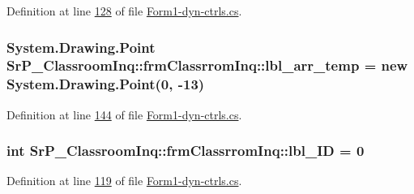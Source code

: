 \-Definition at line \hyperlink{_form1-dyn-ctrls_8cs_source_l00128}{128} of file \hyperlink{_form1-dyn-ctrls_8cs_source}{\-Form1-\/dyn-\/ctrls.\-cs}.

\hypertarget{class_sr_p___classroom_inq_1_1frm_classrrom_inq_ae3405b23105270490b9685ac52e1b574}{
\subsubsection[{lbl\-\_\-arr\-\_\-temp}]{\setlength{\rightskip}{0pt plus 5cm}\-System.\-Drawing.\-Point {\bf \-Sr\-P\-\_\-\-Classroom\-Inq\-::frm\-Classrrom\-Inq\-::lbl\-\_\-arr\-\_\-temp} = new \-System.\-Drawing.\-Point(0, -\/13)}}
\label{class_sr_p___classroom_inq_1_1frm_classrrom_inq_ae3405b23105270490b9685ac52e1b574}


\-Definition at line \hyperlink{_form1-dyn-ctrls_8cs_source_l00144}{144} of file \hyperlink{_form1-dyn-ctrls_8cs_source}{\-Form1-\/dyn-\/ctrls.\-cs}.

\hypertarget{class_sr_p___classroom_inq_1_1frm_classrrom_inq_a15d44adc56e5e6523bfadd27d9966935}{
\subsubsection[{lbl\-\_\-\-I\-D}]{\setlength{\rightskip}{0pt plus 5cm}int {\bf \-Sr\-P\-\_\-\-Classroom\-Inq\-::frm\-Classrrom\-Inq\-::lbl\-\_\-\-I\-D} = 0}}
\label{class_sr_p___classroom_inq_1_1frm_classrrom_inq_a15d44adc56e5e6523bfadd27d9966935}


\-Definition at line \hyperlink{_form1-dyn-ctrls_8cs_source_l00119}{119} of file \hyperlink{_form1-dyn-ctrls_8cs_source}{\-Form1-\/dyn-\/ctrls.\-cs}.

